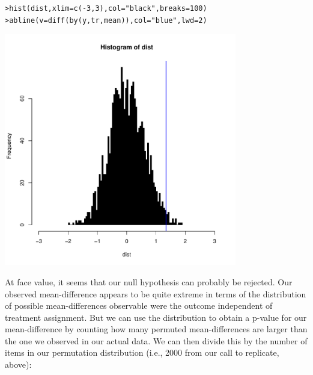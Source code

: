 \documentclass[12pt]{article}\usepackage[]{graphicx}\usepackage[]{color}
\makeatletter
\newcommand{\hlnum}[1]{\textcolor[rgb]{0.82,0.78,0.62}{#1}}%
\newcommand{\hlstr}[1]{\textcolor[rgb]{0.82,0.78,0.62}{#1}}%
\newcommand{\hlopt}[1]{\textcolor[rgb]{0.882,0.878,0.898}{#1}}%
\newcommand{\hlstd}[1]{\textcolor[rgb]{0.882,0.878,0.898}{#1}}%
\newcommand{\hlkwc}[1]{\textcolor[rgb]{0.812,0.522,0.388}{#1}}%
\newcommand{\hlkwd}[1]{\textcolor[rgb]{0.733,0.388,0.812}{#1}}%
\newenvironment{kframe}{%
 \def\at@end@of@kframe{}%
 \ifinner\ifhmode%
  \def\at@end@of@kframe{\end{minipage}}%
  \begin{minipage}{\columnwidth}%
 \fi\fi%
 \def\FrameCommand##1{\hskip\@totalleftmargin \hskip-\fboxsep
 \colorbox{shadecolor}{##1}\hskip-\fboxsep
     \hskip-\linewidth \hskip-\@totalleftmargin \hskip\columnwidth}%
 \MakeFramed {\advance\hsize-\width
   \@totalleftmargin\z@ \linewidth\hsize
   \@setminipage}}%
 {\par\unskip\endMakeFramed%
 \at@end@of@kframe}
\newenvironment{knitrout}{}{} %
\makeatother
\begin{document}
\begin{flushleft}
\begin{knitrout}
\color{fgcolor}\begin{kframe}
\begin{alltt}
\hlstd{> }\hlkwd{hist}\hlstd{(dist,} \hlkwc{xlim} \hlstd{=} \hlkwd{c}\hlstd{(}\hlopt{-}\hlnum{3}\hlstd{,} \hlnum{3}\hlstd{),} \hlkwc{col} \hlstd{=} \hlstr{"black"}\hlstd{,} \hlkwc{breaks} \hlstd{=} \hlnum{100}\hlstd{)}
\hlstd{> }\hlkwd{abline}\hlstd{(}\hlkwc{v} \hlstd{=} \hlkwd{diff}\hlstd{(}\hlkwd{by}\hlstd{(y, tr, mean)),} \hlkwc{col} \hlstd{=} \hlstr{"blue"}\hlstd{,} \hlkwc{lwd} \hlstd{=} \hlnum{2}\hlstd{)}
\end{alltt}
\end{kframe}
\includegraphics[width=4in]{figure/perm6-1} 

\end{knitrout}

At face value, it seems that our null hypothesis can probably be rejected. Our observed mean-difference appears to be quite extreme in terms of the distribution of possible mean-differences observable were the outcome independent of treatment assignment. But we can use the distribution to obtain a p-value for our mean-difference by counting how many permuted mean-differences are larger than the one we observed in our actual data. We can then divide this by the number of items in our permutation distribution (i.e., 2000 from our call to replicate, above):


\end{flushleft}
\end{document}
